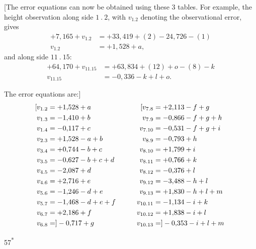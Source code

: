 \par\medskip
\par\noindent\hspace*{\parindent}[The error equations can now be obtained using these 3 tables.
For example, the height observation along side \(1\ .\ 2\), with \(v_{1.2}\)
denoting the observational error, gives
\[
\begin{aligned}
+7{,}165+v_{1.2}&=+33{,}419+(2)-24{,}726-(1)\\
v_{1.2}&=+1{,}528+a,
\end{aligned}
\]
\noindent and along side \(11\ .\ 15\):
\[
\begin{aligned}
+64{,}170+v_{11.15}&=+63{,}834+(12)+o-(8)-k\\
v_{11.15}&=-0{,}336-k+l+o.
\end{aligned}
\]
\par\noindent\hspace*{\parindent}The error equations are:]
\[
\begin{aligned}
\makebox[0pt][r]{[}v_{1.2}&=+1{,}528+a &\qquad \makebox[0pt][r]{[}v_{7.8}&=+2{,}113-f+g\\
v_{1.3}&=-1{,}410+b &\qquad v_{7.9}&=-0{,}866-f+g+h\\
v_{1.4}&=-0{,}117+c &\qquad v_{7.10}&=-0{,}531-f+g+i\\
v_{2.3}&=+1{,}528-a+b &\qquad v_{8.9}&=-0{,}793+h\\
v_{3.4}&=+0{,}744-b+c &\qquad v_{8.10}&=+1{,}799+i\\
v_{3.5}&=-0{,}627-b+c+d &\qquad v_{8.11}&=+0{,}766+k\\
v_{4.5}&=-2{,}087+d &\qquad v_{8.12}&=-0{,}376+l\\
v_{4.6}&=+2{,}716+e &\qquad v_{9.12}&=-3{,}488-h+l\\
v_{5.6}&=-1{,}246-d+e &\qquad v_{9.13}&=+1{,}830-h+l+m\\
v_{5.7}&=-1{,}468-d+e+f &\qquad v_{10.11}&=-1{,}134-i+k\\
v_{6.7}&=+2{,}186+f &\qquad v_{10.12}&=+1{,}838-i+l\\
v_{6.8}&=]-0{,}717+g &\qquad v_{10.13}&=]-0{,}353-i+l+m\\
\end{aligned}
\]
\par\smallskip\noindent\hfill{\footnotesize 57\textsuperscript{*}}\hspace*{.12\linewidth}\par

